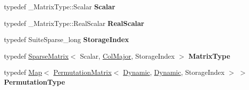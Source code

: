 \begin{DoxyCompactItemize}
\item 
\mbox{\label{class_eigen_1_1_s_p_q_r_a79aab4f4c7b3560c35ff3964e2831168}} 
typedef \+\_\+\+Matrix\+Type\+::\+Scalar {\bfseries Scalar}
\item 
\mbox{\label{class_eigen_1_1_s_p_q_r_aa0433fd3ee69389de7546a1daf40db04}} 
typedef \+\_\+\+Matrix\+Type\+::\+Real\+Scalar {\bfseries Real\+Scalar}
\item 
\mbox{\label{class_eigen_1_1_s_p_q_r_a7154a96ee31df16cc511f275a5b02d27}} 
typedef Suite\+Sparse\+\_\+long {\bfseries Storage\+Index}
\item 
\mbox{\label{class_eigen_1_1_s_p_q_r_ab91804223761e179d79bd3a1aa7c4111}} 
typedef \hyperlink{group___sparse_core___module_class_eigen_1_1_sparse_matrix}{Sparse\+Matrix}$<$ Scalar, \hyperlink{group__enums_ggaacded1a18ae58b0f554751f6cdf9eb13a0cbd4bdd0abcfc0224c5fcb5e4f6669a}{Col\+Major}, Storage\+Index $>$ {\bfseries Matrix\+Type}
\item 
\mbox{\label{class_eigen_1_1_s_p_q_r_aa74de4635fdaee8773d8b320b564db5f}} 
typedef \hyperlink{group___core___module_class_eigen_1_1_map}{Map}$<$ \hyperlink{group___core___module_class_eigen_1_1_permutation_matrix}{Permutation\+Matrix}$<$ \hyperlink{namespace_eigen_ad81fa7195215a0ce30017dfac309f0b2}{Dynamic}, \hyperlink{namespace_eigen_ad81fa7195215a0ce30017dfac309f0b2}{Dynamic}, Storage\+Index $>$ $>$ {\bfseries Permutation\+Type}
\end{DoxyCompactItemize}
